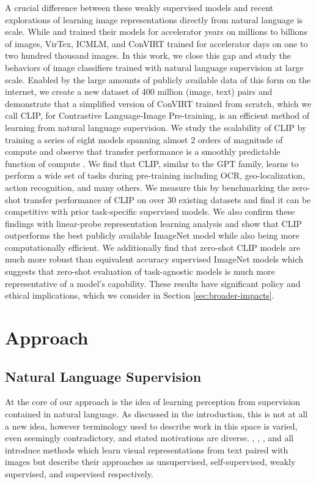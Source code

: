 A crucial difference between these weakly supervised models and recent explorations of learning image representations directly from natural language is scale. While \citet{mahajan2018exploring} and \citet{kolesnikov2019large} trained their models for accelerator years on millions to billions of images, VirTex, ICMLM, and ConVIRT trained for accelerator days on one to two hundred thousand images. In this work, we close this gap and study the behaviors of image classifiers trained with natural language supervision at large scale. Enabled by the large amounts of publicly available data of this form on the internet, we create a new dataset of 400 million (image, text) pairs and demonstrate that a simplified version of ConVIRT trained from scratch, which we call CLIP, for Contrastive Language-Image Pre-training, is an efficient method of learning from natural language supervision. We study the scalability of CLIP by training a series of eight models spanning almost 2 orders of magnitude of compute and observe that transfer performance is a smoothly predictable function of compute \citep{hestness2017deep,kaplan2020scaling}. We find that CLIP, similar to the GPT family, learns to perform a wide set of tasks during pre-training including OCR, geo-localization, action recognition, and many others. We measure this by benchmarking the zero-shot transfer performance of CLIP on over 30 existing datasets and find it can be competitive with prior task-specific supervised models. We also confirm these findings with linear-probe representation learning analysis and show that CLIP outperforms the best publicly available ImageNet model while also being more computationally efficient. We additionally find that zero-shot CLIP models are much more robust than equivalent accuracy supervised ImageNet models which suggests that zero-shot evaluation of task-agnostic models is much more representative of a model's capability. These results have significant policy and ethical implications, which we consider in Section \ref{sec:broader-impacts}.

\section{Approach}

\subsection{Natural Language Supervision}

At the core of our approach is the idea of learning perception from supervision contained in natural language. As discussed in the introduction, this is not at all a new idea, however terminology used to describe work in this space is varied, even seemingly contradictory, and stated motivations are diverse. \citet{zhang2020contrastive}, \citet{gomez2017self}, \citet{joulin2016learning}, and \citet{desai2020virtex} all introduce methods which learn visual representations from text paired with images but describe their approaches as unsupervised, self-supervised, weakly supervised, and supervised respectively.

